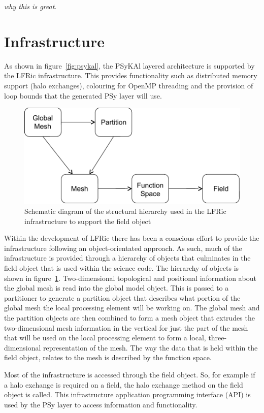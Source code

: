 \documentclass[review,times]{elsarticle}
\begin{document}
{\em why this is great}.


\section{\label{sec:lib}Infrastructure}

As shown in figure~\ref{fig:psykal}, the PSyKAl layered
architecture is supported by the LFRic infrastructure. This provides
functionality such as distributed memory support (halo exchanges),
colouring for OpenMP threading and the provision of loop bounds that the
generated PSy layer will use.

\begin{figure}
\centering\includegraphics[width=0.8\linewidth]{infrastructure_objects.pdf}
\caption{\label{fig:objects} Schematic diagram of the structural
hierarchy used in the LFRic infrastructure to support the field object}
\end{figure}

Within the development of LFRic there has been a conscious effort to
provide the infrastructure following an object-orientated approach. As
such, much of the infrastructure is provided through a hierarchy of
objects that culminates in the field object that is used within the
science code. The hierarchy of objects is shown in
figure~\ref{fig:objects}. Two-dimensional topological and positional
information about the global mesh is read into the global model object.
This is passed to a partitioner to generate a partition object that
describes what portion of the global mesh the local processing element
will be working on. The global mesh and the partition objects are then
combined to form a mesh object that extrudes the two-dimensional mesh
information in the vertical for just the part of the mesh that will be
used on the local processing element to form a local, three-dimensional
representation of the mesh. The way the data that is held within the
field object, relates to the mesh is described by the function space.

Most of the infrastructure is accessed through the field object. So, for
example if a halo exchange is required on a field, the halo exchange
method on the field object is called. This infrastructure application
programming interface (API) is used by the PSy layer to access
information and functionality.
\end{document}
